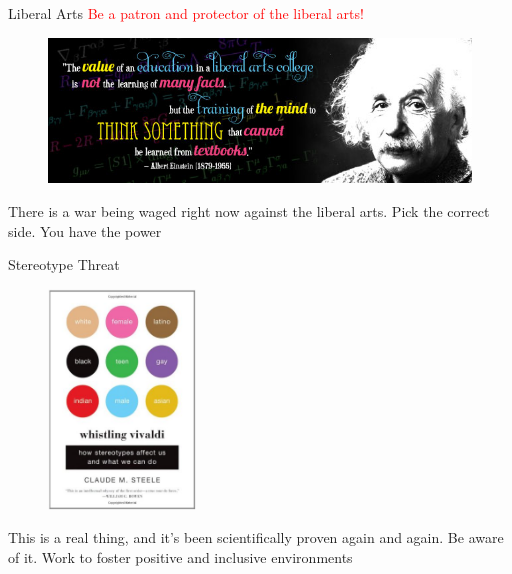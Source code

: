 \documentclass{beamer}
\begin{document}
\begin{frame}{Liberal Arts}
\textcolor{red}{Be a patron and protector of the liberal arts!}

\begin{figure}[t]
    \includegraphics[width=\textwidth]{Einstein_LiberalArts.jpg}
\end{figure}


There is a war being waged right now against the liberal arts.  Pick the correct side.  You have the power

\end{frame}

\begin{frame}{Stereotype Threat}

\begin{figure}[t]
    \includegraphics[width=0.35\textwidth]{WhistlingVivaldi.jpg}
\end{figure}

\small This is a real thing, and it's been scientifically proven again and again.  Be aware of it.  Work to foster positive and inclusive environments

\end{frame}
\end{document}
